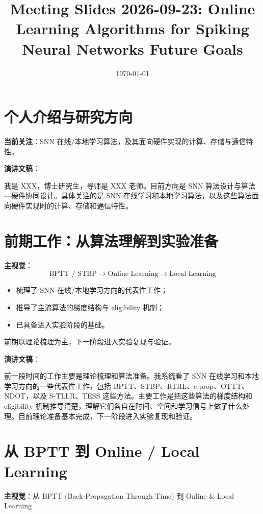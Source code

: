 \documentclass[journal,12pt,onecolumn]{IEEEtran}
\begin{document}
\title{Meeting Slides 2026-09-23: Online Learning Algorithms for Spiking Neural Networks Future Goals}
\author{}
\date{\today}

\maketitle

\section{个人介绍与研究方向}

\textbf{当前关注}：SNN 在线/本地学习算法，及其面向硬件实现的计算、存储与通信特性。

\textbf{演讲文稿}：

我是 XXX，博士研究生，导师是 XXX 老师。目前方向是 SNN 算法设计与算法—硬件协同设计。具体关注的是 SNN 在线学习和本地学习算法，以及这些算法面向硬件实现时的计算、存储和通信特性。

\section{前期工作：从算法理解到实验准备}

\textbf{主视觉}：
\[
\text{BPTT / STBP} \to \text{Online Learning} \to \text{Local Learning}
\]

\begin{itemize}
    \item 梳理了 SNN 在线/本地学习方向的代表性工作；
    \item 推导了主流算法的梯度结构与 eligibility 机制；
    \item 已具备进入实验阶段的基础。
\end{itemize}

前期以理论梳理为主，下一阶段进入实验复现与验证。

\textbf{演讲文稿}：

前一段时间的工作主要是理论梳理和算法准备。我系统看了 SNN 在线学习和本地学习方向的一些代表性工作，包括 BPTT、STBP、RTRL、e-prop、OTTT、NDOT，以及 S-TLLR、TESS 这些方法。主要工作是把这些算法的梯度结构和 eligibility 机制推导清楚，理解它们各自在时间、空间和学习信号上做了什么处理。目前理论准备基本完成，下一阶段进入实验复现和验证。

\section{从 BPTT 到 Online / Local Learning}

\textbf{主视觉}：从 BPTT (Back-Propagation Through Time) 到 Online \& Local Learning
\end{document}

